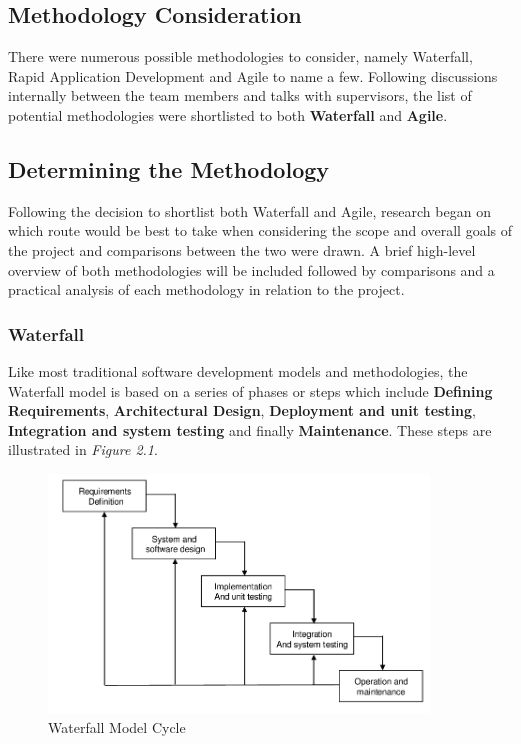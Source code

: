 \subsection{Methodology Consideration}
There were numerous possible methodologies to consider, namely Waterfall, Rapid Application Development and Agile to name a few. Following discussions internally between the team members and talks with supervisors, the list of potential methodologies were shortlisted to both \textbf{Waterfall} and \textbf{Agile}.

\subsection{Determining the Methodology}
Following the decision to shortlist both Waterfall and Agile, research began on which route would be best to take when considering the scope and overall goals of the project and comparisons between the two were drawn. A brief high-level overview of both methodologies will be included followed by comparisons and a practical analysis of each methodology in relation to the project.

\subsubsection{Waterfall}
Like most traditional software development models and methodologies, the Waterfall model is based on a series of phases or steps which include \textbf{Defining Requirements}, \textbf{Architectural Design}, \textbf{Deployment and unit testing}, \textbf{Integration and system testing} and finally \textbf{Maintenance}. These steps are illustrated in \textit{Figure 2.1}.

\begin{figure}[h!]
	\caption{Waterfall Model Cycle}
	\label{image:myImageName}
	\centering
	\includegraphics[width=0.9\textwidth]{images/waterfall.png}
\end{figure}	

